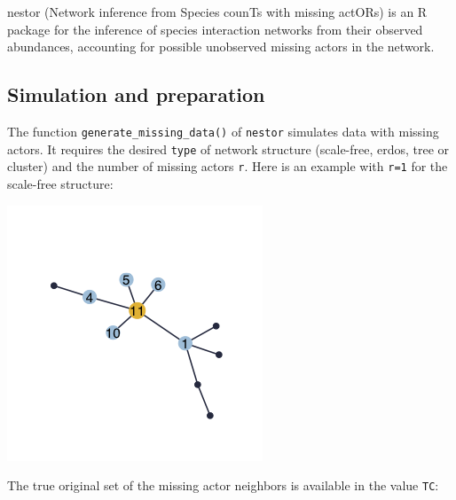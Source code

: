 

nestor (Network inference from Species counTs with missing actORs) is an R package for the inference of species interaction networks from their observed abundances, accounting for possible unobserved missing actors in the network.

\tocless\subsection{Simulation and preparation}\label{simulation-and-preparation}

The function \texttt{generate\_missing\_data()} of \texttt{nestor}  simulates data with missing actors. 
It requires the desired \texttt{type} of network structure (scale-free, erdos, tree or cluster) and the
number of missing actors \texttt{r}. Here is an example with
\texttt{r=1} for the scale-free structure:

\begin{Shaded}
\begin{Highlighting}[]
\NormalTok{, }\NormalTok{)}
\end{Highlighting}
\end{Shaded}

\begin{center}\includegraphics[width=0.3\linewidth]{nestorArticle/man/figures/README-unnamed-chunk-2-1} \end{center}

The true original set of the missing actor neighbors is available in the
value \texttt{TC}:

\begin{Shaded}
\begin{Highlighting}[]
\OperatorTok{\$}
\CommentTok{#> [[1]]}
\end{Highlighting}
\end{Shaded}

